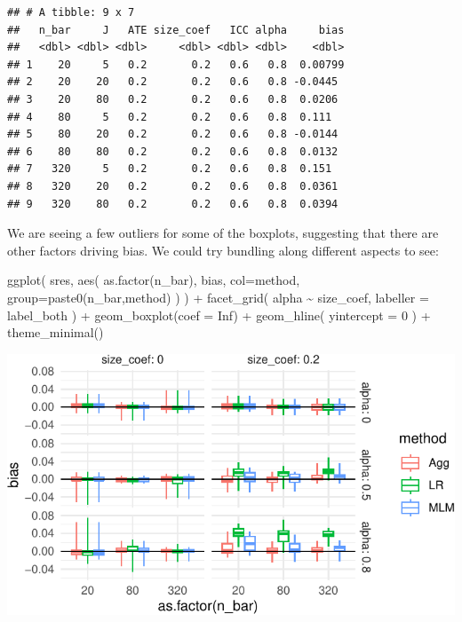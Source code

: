 \documentclass[
]{book}
\newenvironment{Shaded}{\begin{snugshade}}{\end{snugshade}}
\newcommand{\AttributeTok}[1]{\textcolor[rgb]{0.77,0.63,0.00}{#1}}
\newcommand{\ConstantTok}[1]{\textcolor[rgb]{0.00,0.00,0.00}{#1}}
\newcommand{\DecValTok}[1]{\textcolor[rgb]{0.00,0.00,0.81}{#1}}
\newcommand{\FunctionTok}[1]{\textcolor[rgb]{0.00,0.00,0.00}{#1}}
\newcommand{\NormalTok}[1]{#1}
\newcommand{\SpecialCharTok}[1]{\textcolor[rgb]{0.00,0.00,0.00}{#1}}
\begin{document}
\begin{verbatim}
## # A tibble: 9 x 7
##   n_bar     J   ATE size_coef   ICC alpha     bias
##   <dbl> <dbl> <dbl>     <dbl> <dbl> <dbl>    <dbl>
## 1    20     5   0.2       0.2   0.6   0.8  0.00799
## 2    20    20   0.2       0.2   0.6   0.8 -0.0445 
## 3    20    80   0.2       0.2   0.6   0.8  0.0206 
## 4    80     5   0.2       0.2   0.6   0.8  0.111  
## 5    80    20   0.2       0.2   0.6   0.8 -0.0144 
## 6    80    80   0.2       0.2   0.6   0.8  0.0132 
## 7   320     5   0.2       0.2   0.6   0.8  0.151  
## 8   320    20   0.2       0.2   0.6   0.8  0.0361 
## 9   320    80   0.2       0.2   0.6   0.8  0.0394
\end{verbatim}

We are seeing a few outliers for some of the boxplots, suggesting that there are other factors driving bias. We could try bundling along different aspects to see:

\begin{Shaded}
\begin{Highlighting}[]
\FunctionTok{ggplot}\NormalTok{( sres, }\FunctionTok{aes}\NormalTok{( }\FunctionTok{as.factor}\NormalTok{(n\_bar), bias, }\AttributeTok{col=}\NormalTok{method, }\AttributeTok{group=}\FunctionTok{paste0}\NormalTok{(n\_bar,method) ) ) }\SpecialCharTok{+}
  \FunctionTok{facet\_grid}\NormalTok{( alpha }\SpecialCharTok{\textasciitilde{}}\NormalTok{  size\_coef, }\AttributeTok{labeller =}\NormalTok{ label\_both ) }\SpecialCharTok{+}
  \FunctionTok{geom\_boxplot}\NormalTok{(}\AttributeTok{coef =} \ConstantTok{Inf}\NormalTok{) }\SpecialCharTok{+}
  \FunctionTok{geom\_hline}\NormalTok{( }\AttributeTok{yintercept =} \DecValTok{0}\NormalTok{ ) }\SpecialCharTok{+}
  \FunctionTok{theme\_minimal}\NormalTok{()}
\end{Highlighting}
\end{Shaded}

\begin{center}\includegraphics[width=0.75\linewidth]{Designing-Simulations-in-R_files/figure-latex/clusterRCT_plot_bias_v2-1} \end{center}
\end{document}
